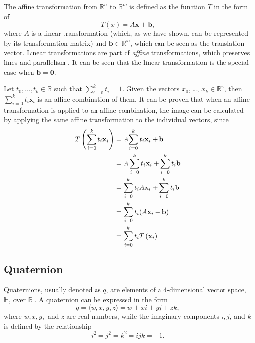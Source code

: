 \documentclass[conference]{IEEEtran}
\begin{document}
The affine transformation from $\mathbb{R}^n$ to $\mathbb{R}^m$ is defined as the function $T$ in the form of
\begin{equation}
    T(x) = A\mathbf{x} + \mathbf{b},
\end{equation}
where $A$ is a linear transformation (which, as we have shown, can be represented by its transformation matrix) and $\mathbf{b} \in \mathbb{R}^m$, which can be seen as the translation vector. Linear transformations are part of \textit{affine} transformations, which preserves lines and parallelism \cite{affine1}. It can be seen that the linear transformation is the special case when $\mathbf{b} = \mathbf{0}$.

Let $t_0, \ldots, t_k \in \mathbb{R}$ such that $\sum_{i=0}^k t_i = 1$. Given the vectors $x_0$, \ldots , $x_k \in \mathbb{R}^n$, then $\sum_{i=0}^k t_i\mathbf{x}_i$ is an affine combination of them\cite{affine2}. It can be proven that when an affine transformation is applied to an affine combination, the image can be calculated by applying the same affine transformation to the individual vectors, since
\begin{align}
    T\left(\sum_{i=0}^k t_i\mathbf{x}_i\right) &= A{\sum_{i=0}^k t_i \mathbf{x}_i} + \mathbf{b} \notag \\
    &= A\sum_{i=0}^k t_i\mathbf{x}_i + \sum_{i=0}^k t_i \mathbf{b} \notag \\
    &= \sum_{i=0}^k t_i A\mathbf{x}_i + \sum_{i=0}^k t_i \mathbf{b} \notag \\
    &= \sum_{i=0}^k t_i (A\mathbf{x}_i + \mathbf{b}) \notag \\
    &= \sum_{i=0}^k t_i T\left(\mathbf{x}_i\right)
\end{align}

\subsection{Quaternion} 
Quaternions, usually denoted as $q$, are elements of a 4-dimensional vector space, $\mathbb{H}$, over $\mathbb{R}$ \cite{lengyel}\cite{quat}. A quaternion can be expressed in the form 
\begin{equation}
    q = \langle w, x, y, z \rangle = w + xi + yj + zk, 
\end{equation}
where $w, x, y,$ and $z$ are real numbers, while the imaginary components $i, j$, and $k$ is defined by the relationship
\begin{equation}
    i^2 = j^2 = k^2 = ijk = -1.
\end{equation}
\end{document}
